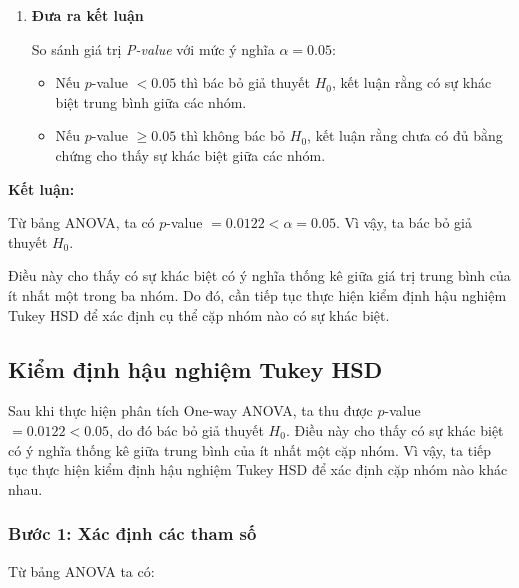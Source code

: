 \begin{enumerate}
Excel sẽ xuất bảng kết quả ANOVA bao gồm các thông tin như:
\begin{itemize}
\item Sum of Squares (SS)
\item Degrees of Freedom (df)
\item Mean Square (MS)
\item F-statistic
\item P-value
\end{itemize}

\item \textbf{Đưa ra kết luận}

So sánh giá trị \textit{P-value} với mức ý nghĩa $\alpha = 0.05$:

\begin{itemize}
\item Nếu $p$-value $< 0.05$ thì bác bỏ giả thuyết $H_0$, kết luận rằng có sự khác biệt trung bình giữa các nhóm.
\item Nếu $p$-value $\ge 0.05$ thì không bác bỏ $H_0$, kết luận rằng chưa có đủ bằng chứng cho thấy sự khác biệt giữa các nhóm.
\end{itemize}
\end{enumerate}

\textbf{Kết luận:}

Từ bảng ANOVA, ta có $p$-value $= 0.0122 < \alpha = 0.05$. Vì vậy, ta bác bỏ giả thuyết $H_0$.

Điều này cho thấy có sự khác biệt có ý nghĩa thống kê giữa giá trị trung bình của ít nhất một trong ba nhóm. Do đó, cần tiếp tục thực hiện kiểm định hậu nghiệm Tukey HSD để xác định cụ thể cặp nhóm nào có sự khác biệt.

\subsection{Kiểm định hậu nghiệm Tukey HSD}

Sau khi thực hiện phân tích One-way ANOVA, ta thu được $p$-value $=0.0122 < 0.05$,
do đó bác bỏ giả thuyết $H_0$. Điều này cho thấy có sự khác biệt có ý nghĩa
thống kê giữa trung bình của ít nhất một cặp nhóm. Vì vậy, ta tiếp tục thực
hiện kiểm định hậu nghiệm Tukey HSD để xác định cặp nhóm nào khác nhau.

\subsubsection*{Bước 1: Xác định các tham số}

Từ bảng ANOVA ta có:

